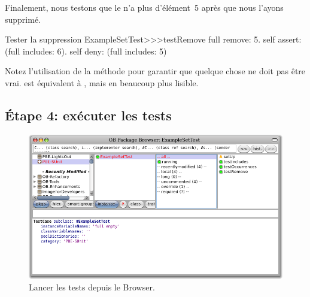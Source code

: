 \documentclass[a4paper,10pt,twoside]{book}
\begin{document}
Finalement, nous testons que le  n'a plus d'élément~5 après que nous l'ayons supprimé.

\begin{method}[testRemove]{Tester la suppression}
ExampleSetTest>>>testRemove
	full remove: 5.
	self assert: (full includes: 6).
	self deny: (full includes: 5)
\end{method}

\noindent
Notez l'utilisation de la méthode  pour garantir que quelque chose ne doit pas être vrai.
 est équivalent à , mais en beaucoup plus lisible.
\subsection{Étape 4: exécuter les tests}

\begin{figure}[tbh]
  \begin{center}
	\includegraphics[width=\linewidth]{browser-tests}
	\caption{Lancer les tests \sunit depuis le Browser.}
  \end{center}
\end{figure}
\end{document}
